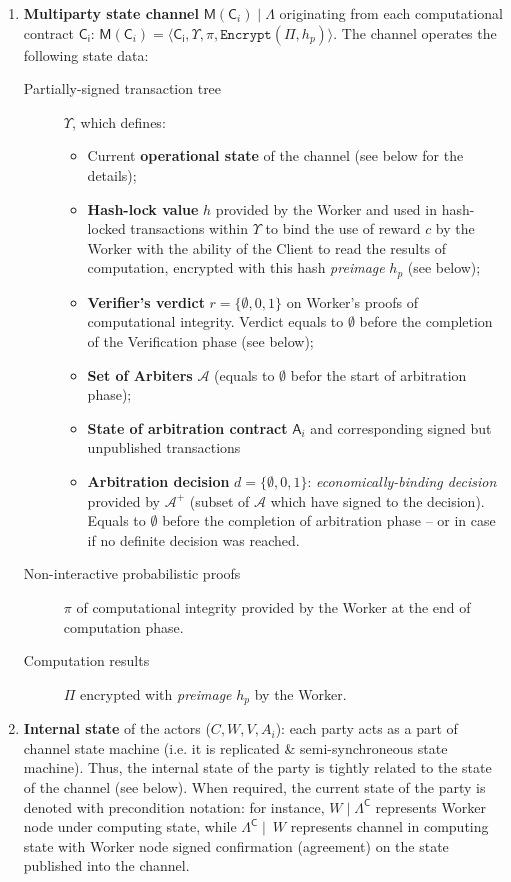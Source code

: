 \documentclass[a4paper]{article}
\begin{document}
\begin{enumerate}
    \item \textbf{Multiparty state channel} $\mathsf{M}(\mathsf{C}_i) \mid \Lambda$ originating from each computational contract $\mathsf{C_i}$: $\mathsf{M}(\mathsf{C}_i) = \langle \mathsf{C_i}, \Upsilon, \pi, \mathtt{Encrypt}(\Pi, h_p)\rangle$. The channel operates the following state data:
    \begin{description}
        \item[Partially-signed transaction tree] $\Upsilon$, which defines:
        \begin{itemize}
            \item Current \textbf{operational state} of the channel (see below for the details);
            \item \textbf{Hash-lock value} $h$ provided by the Worker and used in hash-locked transactions within $\Upsilon$ to bind the use of reward $c$ by the Worker with the ability of the Client to read the results of computation, encrypted with this hash \textit{preimage} $h_p$ (see below);
            \item \textbf{Verifier's verdict} $r=\{\emptyset,0,1\}$ on Worker's proofs of computational integrity. Verdict equals to $\emptyset$ before the completion of the Verification phase (see below);
            \item \textbf{Set of Arbiters} $\mathcal{A}$ (equals to $\emptyset$ befor the start of arbitration phase);
            \item \textbf{State of arbitration contract} $\mathsf{A}_i$ and corresponding signed but unpublished transactions
            \item \textbf{Arbitration decision} $d=\{\emptyset,0,1\}$: \textit{economically-binding decision} provided by $\mathcal{A^+}$ (subset of $\mathcal{A}$ which have signed to the decision). Equals to $\emptyset$ before the completion of arbitration phase -- or in case if no definite decision was reached.
        \end{itemize}
        \item[Non-interactive probabilistic proofs] $\pi$ of computational integrity provided by the Worker at the end of computation phase.
        \item[Computation results] $\Pi$ encrypted with \textit{preimage} $h_p$ by the Worker.
    \end{description}
    
    \item \textbf{Internal state} of the actors ($C, W, V, A_i$): each party acts as a part of channel state machine (i.e. it is replicated \& semi-synchroneous state machine). Thus, the internal state  of the party is tightly related to the state of the channel (see below). When required, the current state of the party is denoted with  precondition notation: for instance, $W\mid \Lambda^\mathsf{C}$ represents Worker node under computing state, while $\Lambda^\mathsf{C} \mid\: W$ represents channel in computing state with Worker node signed confirmation (agreement) on the state published into the channel.
\end{enumerate}
\end{document}
